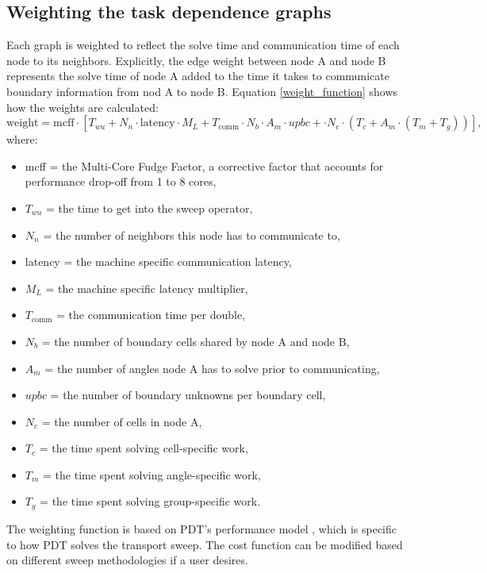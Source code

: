 \subsection{Weighting the task dependence graphs}

Each graph is weighted to reflect the solve time and communication time of each node to its neighbors. Explicitly, the edge weight between node A and node B represents the solve time of node A added to the time it takes to communicate boundary information from nod A to node B. Equation \ref{weight_function} shows how the weights are calculated:
\begin{equation}
\text{weight} = \text{mcff}\cdot [T_{wu} + N_n\cdot \text{latency}\cdot M_L + T_{\text{comm}}\cdot N_b\cdot A_m\cdot upbc + \cdot N_c\cdot (T_c + A_m\cdot (T_m + T_g))],
\label{weight_function}
\end{equation}
where:
\begin{itemize}
  \item mcff = the Multi-Core Fudge Factor, a corrective factor that accounts for performance drop-off from 1 to 8 cores,
  \item $T_{wu}$ = the time to get into the sweep operator,
  \item $N_n$ = the number of neighbors this node has to communicate to,
  \item latency = the machine specific communication latency,
  \item $M_L$ = the machine specific latency multiplier,
  \item $T_{\text{comm}}$ = the communication time per double,
  \item $N_b$ = the number of boundary cells shared by node A and node B,
  \item $A_m$ = the number of angles node A has to solve prior to communicating,
  \item $upbc$ = the number of boundary unknowns per boundary cell,
  \item $N_c$ = the number of cells in node A,
  \item $T_c$ = the time spent solving cell-specific work,
  \item $T_m$ = the time spent solving angle-specific work,
  \item $T_g$ = the time spent solving group-specific work.
\end{itemize}
The weighting function is based on PDT's performance model \cite{mpadams2013,mpadams2015}, which is specific to how PDT solves the transport sweep. The cost function can be modified based on different sweep methodologies if a user desires.

